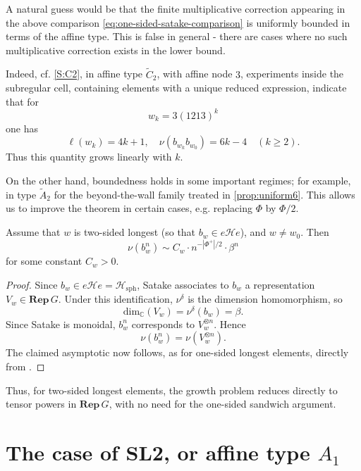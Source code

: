 \documentclass[a4paper,11pt]{amsart}
\newcommand{\C}{\mathbb{C}}
\renewcommand{\dim}[1][\C]{\mathrm{dim}_{#1}}
\newcommand{\Hecke}{\mc H}
\newcommand{\Rep}{\mathbf{Rep}\,}
\newcommand{\mc}{\mathcal}
\numberwithin{equation}{subsection}
\theoremstyle{definition}
\theoremstyle{remark}
\begin{document}
\begin{Remark}\label{rem:uniform-false}
A natural guess would be that the finite multiplicative correction appearing in the above
comparison \autoref{eq:one-sided-satake-comparison} is uniformly bounded in terms of the affine type. This is false in general - there are cases where no such multiplicative correction exists in the lower bound.

Indeed, cf. \autoref{S:C2}, in affine type \(\widetilde C_2\), with affine node \(3\), experiments
inside the subregular cell, containing elements with a unique reduced
expression, indicate that for
\[
w_k=3(1213)^k
\]
one has
\[
\ell(w_k)=4k+1,
\quad
\nu(b_{w_k}b_{w_0})=6k-4
\quad(k\geq 2).
\]
Thus this quantity grows linearly with \(k\).

On the other hand, boundedness holds in some important regimes; for example, in
type \(\widetilde A_2\) for the beyond-the-wall family treated in
\autoref{prop:uniform6}. This allows us to improve the theorem in certain cases, e.g. replacing $\Phi$ by $\Phi/2$.
\end{Remark}

\begin{Theorem}\label{prop:satake-two-sided}
Assume that $w$ is two-sided longest (so that \(b_w\in e\Hecke e\)), and $w\neq w_0$. Then
\[
\nu(b_w^n)
\sim
C_w\cdot n^{-|\Phi^+|/2}\cdot\beta^n
\]
for some constant \(C_w>0\).
\end{Theorem}

\begin{proof}
Since \(b_w\in e\Hecke e=\Hecke_{\mathrm{sph}}\), Satake associates to \(b_w\)
a representation \(V_w\in\Rep G\). Under this identification,
\(\nu^\delta\) is the dimension homomorphism, so
\[
\dim(V_w)=\nu^\delta(b_w)=\beta.
\]
Since Satake is monoidal, \(b_w^n\) corresponds to \(V_w^{\otimes n}\). Hence
\[
\nu(b_w^n)=\nu(V_w^{\otimes n}).
\]
The claimed asymptotic now follows, as for one-sided longest elements, directly from
\cite[Theorem 2.5]{CEO19}.
\end{proof}

Thus, for two-sided longest elements, the growth problem reduces directly to
tensor powers in \(\Rep G\), with no need for the one-sided sandwich argument.

\section{The case of SL2, or affine type \texorpdfstring{$A_1$}{A1}}\label{sec:sl2}
\end{document}
